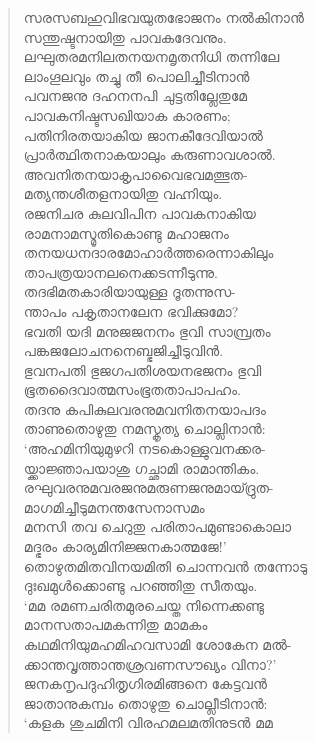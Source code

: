 \begin{verse}
സരസബഹുവിഭവയുതഭോജനം നല്‍കിനാന്‍\\
സന്തുഷ്ടനായിതു പാവകദേവനും.\\
ലഘുതരമനിലതനയനമൃതനിധി തന്നിലേ\\
ലാംഗൂലവും തച്ചു തീ പൊലിച്ചീടിനാന്‍\\
പവനജനു ദഹനനപി ചുട്ടതില്ലേതുമേ\\
പാവകനിഷ്ടസഖിയാക കാരണം;\\
പതിനിരതയാകിയ ജാനകീദേവിയാല്‍\\
പ്രാര്‍ത്ഥിതനാകയാലും കരുണാവശാല്‍.\\
അവനിതനയാകൃപാവൈഭവമത്ഭുത-\\
മത്യന്തശീതളനായിതു വഹ്നിയും.\\
രജനിചര കുലവിപിന പാവകനാകിയ\\
രാമനാമസ്മൃതികൊണ്ടു മഹാജനം\\
തനയധനദാരമോഹാര്‍ത്തരെന്നാകിലും\\
താപത്രയാനലനെക്കടന്നീടുന്നു.\\
തദഭിമതകാരിയായുള്ള ദൂതന്നുസ-\\
ന്താപം പകൃതാനലേന ഭവിക്കുമോ?\\
ഭവതി യദി മനുജജനനം ഭുവി സാമ്പ്രതം\\
പങ്കജലോചനനെബ്ഭജിച്ചീടുവിന്‍.\\
ഭുവനപതി ഭുജഗപതിശയനഭജനം ഭുവി\\
ഭൂതദൈവാത്മസംഭൂതതാപാപഹം.\\
തദനു കപികുലവരനുമവനിതനയാപദം\\
താണുതൊഴുതു നമസ്കൃത്യ ചൊല്ലിനാന്‍:\\
‘അഹമിനിയുമുഴറി നടകൊള്ളുവനക്കര-\\
യ്ക്കാജ്ഞാപയാശു ഗച്ഛാമി രാമാന്തികം.\\
രഘുവരനുമവരജനുമരുണജനുമായ്ദ്രുത-\\
മാഗമിച്ചീടുമനന്തസേനാസമം\\
മനസി തവ ചെറുതു പരിതാപമുണ്ടാകൊലാ\\
മദ്ഭരം കാര്യമിനിജ്ജനകാത്മജേ!’\\
തൊഴുതമിതവിനയമിതി ചൊന്നവന്‍ തന്നോടു\\
ദുഃഖമുള്‍ക്കൊണ്ടു പറഞ്ഞിതു സീതയും.\\
‘മമ രമണചരിതമുരചെയ്ത നിന്നെക്കണ്ടു\\
മാനസതാപമകന്നിതു മാമകം\\
കഥമിനിയുമഹമിഹവസാമി ശോകേന മല്‍-\\
ക്കാന്തവൃത്താന്തശ്രവണസൗഖ്യം വിനാ?’\\
ജനകനൃപദുഹിതൃഗിരമിങ്ങനെ കേട്ടവന്‍\\
ജാതാനുകമ്പം തൊഴുതു ചൊല്ലീടിനാന്‍:\\
‘കളക ശുചമിനി വിരഹമലമതിനുടന്‍ മമ\\

\end{verse}
